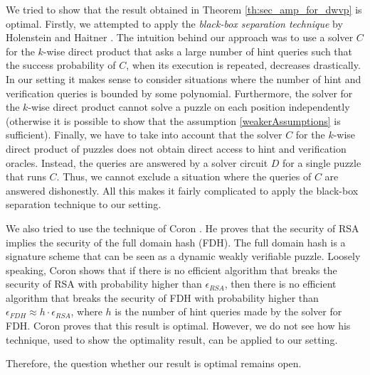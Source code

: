 We tried to show that the result obtained in Theorem \ref{th:sec_amp_for_dwvp} is optimal.
Firstly, we attempted to apply the \textit{black-box separation technique} by Holenstein and Haitner \cite{haitner2009possibility}.
The intuition behind our approach was to use a solver $C$ for the $k$-wise direct product that asks a large number of hint queries such that
the success probability of $C$, when its execution is repeated, decreases drastically.
In our setting it makes sense to consider situations where the number of hint and verification queries is bounded by some polynomial.
Furthermore, the solver for the $k$-wise direct product cannot solve a puzzle on each position independently
(otherwise it is possible to show that the assumption \eqref{weakerAssumptions} is sufficient).
Finally, we have to take into account that the solver $C$ for the $k$-wise direct product of puzzles does not obtain direct access to hint and verification oracles.
Instead, the queries are answered by a solver circuit $D$ for a single puzzle that runs $C$. Thus, we cannot exclude a situation where the queries of $C$
are answered dishonestly. All this makes it fairly complicated to apply the black-box separation technique to our setting.

We also tried to use the technique of Coron \cite{coron2000exact, coron2002optimal}.
He proves that the security of RSA implies the security of the full domain hash (FDH).
The full domain hash is a signature scheme that can be seen as a dynamic weakly verifiable puzzle.
Loosely speaking, Coron shows that if there is no efficient algorithm that breaks the security of RSA with probability higher
than $\epsilon_{\mathit{RSA}}$, then there is no efficient algorithm that breaks the security of FDH with probability higher than
$\epsilon_{\mathit{FDH}} \approx h \cdot \epsilon_{\mathit{RSA}}$, where $h$ is the number of hint queries made by the solver for FDH.
Coron proves that this result is optimal. However, we do not see how his technique, used to show the optimality result, can be applied to our setting.

Therefore, the question whether our result is optimal remains open.

